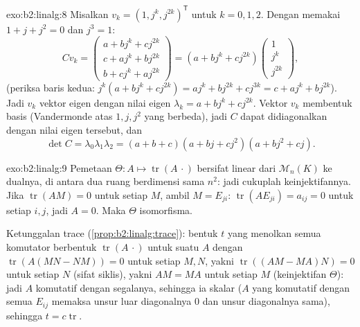 \begin{solution}{exo:b2:linalg:8}
Misalkan $v_k = (1, j^k, j^{2k})^{\mathsf T}$ untuk $k = 0, 1, 2$. Dengan
memakai $1 + j + j^2 = 0$ dan $j^3 = 1$:
\[
C v_k =
\begin{pmatrix}
a + b j^k + c j^{2k}\\
c + a j^k + b j^{2k}\\
b + c j^k + a j^{2k}
\end{pmatrix}
= (a + b j^k + c j^{2k})
\begin{pmatrix} 1\\ j^k\\ j^{2k}\end{pmatrix},
\]
(periksa baris kedua: $j^k(a + bj^k + cj^{2k}) = aj^k + bj^{2k} +
cj^{3k} = c + aj^k + bj^{2k}$). Jadi $v_k$ vektor eigen dengan
nilai eigen $\lambda_k = a + bj^k + cj^{2k}$. Vektor $v_k$ membentuk basis
(Vandermonde atas $1, j, j^2$ yang berbeda), jadi $C$ dapat didiagonalkan
dengan nilai eigen tersebut, dan
\[
\det C = \lambda_0\lambda_1\lambda_2
= (a+b+c)(a + bj + cj^2)(a + bj^2 + cj).
\]
\end{solution}

\begin{solution}{exo:b2:linalg:9}
Pemetaan $\Theta \colon A \mapsto \operatorname{tr}(A\,\cdot)$ bersifat
linear dari $\mathcal{M}_n(K)$ ke dualnya, di antara dua ruang berdimensi
sama $n^2$: jadi cukuplah keinjektifannya. Jika $\operatorname{tr}(AM) =
0$ untuk setiap $M$, ambil $M = E_{ji}$: $\operatorname{tr}(A E_{ji}) =
a_{ij} = 0$ untuk setiap $i, j$, jadi $A = 0$. Maka $\Theta$ isomorfisma.

Ketunggalan trace (\cref{prop:b2:linalg:trace}): bentuk $t$ yang
menolkan semua komutator berbentuk $\operatorname{tr}(A\,\cdot)$ untuk
suatu $A$ dengan $\operatorname{tr}(A(MN - NM)) = 0$ untuk setiap $M, N$,
yakni $\operatorname{tr}((AM - MA)N) = 0$ untuk setiap $N$ (sifat
siklis), yakni $AM = MA$ untuk setiap $M$ (keinjektifan $\Theta$): jadi
$A$ komutatif dengan segalanya, sehingga ia skalar ($A$ yang komutatif
dengan semua $E_{ij}$ memaksa unsur luar diagonalnya $0$ dan unsur
diagonalnya sama), sehingga $t = c \operatorname{tr}$.
\end{solution}

